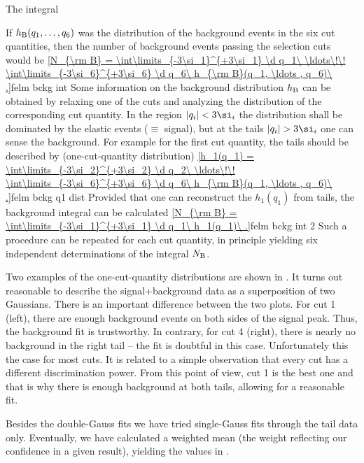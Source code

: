 \caption{The integral}

If $h_{\rm B}(q_1, \ldots , q_6)$ was the distribution of the background events in the six cut quantities, then the number of background events passing the selection cuts would be
\eqref{N_{\rm B} = \int\limits_{-3\si_1}^{+3\si_1} \d q_1\ \ldots\!\! \int\limits_{-3\si_6}^{+3\si_6} \d q_6\  h_{\rm B}(q_1, \ldots , q_6)\ .}{felm bckg int}
Some information on the background distribution $h_{\rm B}$ can be obtained by relaxing one of the cuts and analyzing the distribution of the corresponding cut quantity. In the region $|q_i| < 3\si_i$ the distribution shall be dominated by the elastic events ($\equiv$ signal), but at the tails $|q_i|>3\si_i$ one can sense the background. For example for the first cut quantity, the tails should be described by (one-cut-quantity distribution)
\eqref{h_1(q_1) = \int\limits_{-3\si_2}^{+3\si_2} \d q_2\ \ldots\!\! \int\limits_{-3\si_6}^{+3\si_6} \d q_6\  h_{\rm B}(q_1, \ldots , q_6)\ .}{felm bckg q1 dist}
Provided that one can reconstruct the $h_1(q_1)$ from tails, the background integral can be calculated
\eqref{N_{\rm B} = \int\limits_{-3\si_1}^{+3\si_1} \d q_1\ h_1(q_1)\ .}{felm bckg int 2}
Such a procedure can be repeated for each cut quantity, in principle yielding six independent determinations of the integral $N_{\rm B}$.


Two examples of the one-cut-quantity distributions are shown in . It turns out reasonable to describe the signal+background data as a superposition of two Gaussians.
There is an important difference between the two plots. For cut 1 (left), there are enough background events on both sides of the signal peak. Thus, the background fit is trustworthy. In contrary, for cut 4 (right), there is nearly no background in the right tail -- the fit is doubtful in this case. Unfortunately this the case for most cuts. It is related to a simple observation that every cut has a different discrimination power. From this point of view, cut 1 is the best one and that is why there is enough background at both tails, allowing for a reasonable fit.

Besides the double-Gauss fits we have tried single-Gauss fits through the tail data only. Eventually, we have calculated a weighted mean (the weight reflecting our confidence in a given result), yielding the values in .

